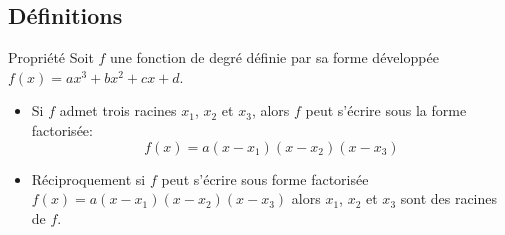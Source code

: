 \documentclass[11pt,a4paper]{article}
\theoremstyle{break}
\begin{document}
	\subsection{Définitions}
	\begin{bclogo}[couleur = yellow!30,arrondi =0.1,logo =\bcbook]{Propriété}
		Soit $f$ une fonction de degré définie par sa forme développée 
		$f(x)=ax^3+bx^2+cx+d$. 
		\begin{itemize}
			\item Si $f$ admet trois racines $x_1$, $x_2$ et $x_3$, alors $f$ 
			peut s'écrire sous la forme factorisée: 
			$$f(x)=a\left(  x-x_1\right) \left(  x-x_2\right) \left(  x-x_3\right) $$
			\item Réciproquement si $f$ peut s'écrire sous forme factorisée $f(x)=a\left(  x-x_1\right) \left(  x-x_2\right) \left(  x-x_3\right) $ alors $x_1$, $x_2$ et $x_3$ sont des racines de $f$.
		\end{itemize}
		\end{bclogo}
\end{document}
